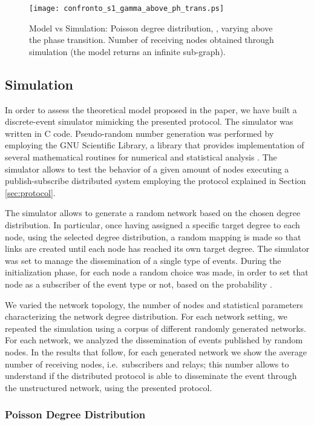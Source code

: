 \documentclass[10pt, conference, compsocconf]{IEEEtran}
\begin{document}
\begin{figure}[t]
   \centering
   \texttt{[image: confronto\_s1\_gamma\_above\_ph\_trans.ps]}
   \caption{Model vs Simulation: Poisson degree distribution, , varying  above the phase transition. Number of receiving nodes obtained through simulation (the model returns an infinite sub-graph).}
   \label{fig:confronto_g_above}
\end{figure}


\subsection{Simulation}

In order to assess the theoretical model proposed in the paper, we have built a discrete-event simulator mimicking the presented protocol. The simulator was written in C code. Pseudo-random number generation was performed by employing the GNU Scientific Library,  a library that provides implementation of several mathematical routines for numerical and statistical analysis \cite{gsl-web-2010}. The simulator allows to test the behavior of a given amount of nodes executing a publish-subscribe distributed system employing the protocol explained in Section \ref{sec:protocol}.

The simulator allows to generate a random network based on the chosen degree distribution. In particular, once having assigned a specific target degree to each node, using the selected degree distribution, a random mapping is made so that links are created until each node has reached its own target degree.
The simulator was set to manage the dissemination of a single type of events.
During the initialization phase, for each node a random choice was made, in order to set that node as a subscriber of the event type or not, based on the probability .

We varied the network topology, the number of nodes and statistical parameters characterizing the network degree distribution. For each network setting, we repeated the simulation using a corpus of  different randomly generated networks. For each network, we analyzed the dissemination of  events published by random nodes. In the results that follow, for each generated network we show the average number of receiving nodes, i.e.~subscribers and relays; this number allows to understand if the distributed protocol is able to disseminate the event through the unstructured network, using the presented protocol. 

\subsubsection{Poisson Degree Distribution}
\end{document}
